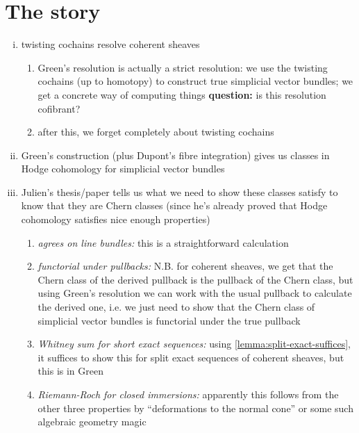 
\section{The story} %
\label{sec:the_story}

    \begin{enumerate}[(i)]
        \item twisting cochains resolve coherent sheaves
        \begin{enumerate}
            \item Green's resolution is actually a strict resolution: we use the twisting cochains (up to homotopy) to construct true simplicial vector bundles; we get a concrete way of computing things {\color{red}\textbf{question:} is this resolution cofibrant?}
            \item after this, we forget completely about twisting cochains
        \end{enumerate}
        \item Green's construction (plus Dupont's fibre integration) gives us classes in Hodge cohomology for simplicial vector bundles
        \item Julien's thesis/paper tells us what we need to show these classes satisfy to know that they are Chern classes (since he's already proved that Hodge cohomology satisfies nice enough properties)
        \begin{enumerate}
            \item \emph{agrees on line bundles:} this is a straightforward calculation
            \item \emph{functorial under pullbacks:} N.B. for coherent sheaves, we get that the Chern class of the derived pullback is the pullback of the Chern class, but using Green's resolution we can work with the usual pullback to calculate the derived one, i.e. we just need to show that the Chern class of simplicial vector bundles is functorial under the true pullback
            \item \emph{Whitney sum for short exact sequences:} using \cref{lemma:split-exact-suffices}, it suffices to show this for split exact sequences of coherent sheaves, but this is in Green
            \item \emph{Riemann-Roch for closed immersions:} apparently this follows from the other three properties by ``deformations to the normal cone'' or some such algebraic geometry magic
        \end{enumerate}
    \end{enumerate}

